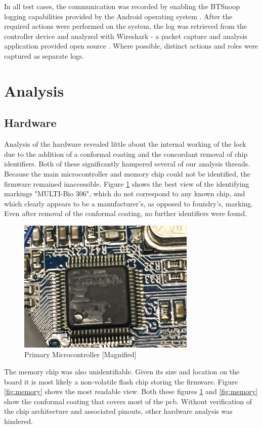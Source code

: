 \documentclass[conference]{IEEEtran}
\begin{document}
In all test cases, the communication was recorded by enabling the BTSnoop logging capabilities provided by the Android operating system \cite{AndroidDevelopers}.  After the required actions were performed on the system, the log was retrieved from the controller device and analyzed with Wireshark - a packet capture and analysis application provided open source \cite{Sharpe}.  Where possible, distinct actions and roles were captured as separate logs.


\section{Analysis}
\subsection{Hardware}

Analysis of the hardware revealed little about the internal working of the lock due to the addition of a conformal coating and the concordant removal of chip identifiers. Both of these significantly hampered several of our analysis threads. Because the main microcontroller and memory chip could not be identified, the firmware remained inaccessible. Figure \ref{fig:ChipText} shows the best view of the identifying markings "MULTI-Bio 306", which do not correspond to any known chip, and which clearly appears to be a manufacturer's, as opposed to foundry's, marking. Even after removal of the conformal coating, no further identifiers were found.  

\begin{figure}[ht]
  \includegraphics[width=8.5cm]{images/MainChipText.JPG}
  \caption{Primary Microcontroller [Magnified]}
  \label{fig:ChipText}
\end{figure}

The memory chip was also unidentifiable.  Given its size and location on the board it is most likely a non-volatile flash chip storing the firmware.  Figure \ref{fig:memory} shows the most readable view. Both these figures \ref{fig:ChipText} and \ref{fig:memory} show the conformal coating that covers most of the \gls{pcb}. Without verification of the chip architecture and associated pinouts, other hardware analysis was hindered. 
\end{document}
